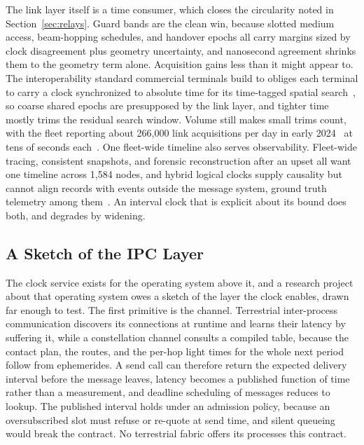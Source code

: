 \documentclass[twocolumn,10pt]{article}
\begin{document}
The link layer itself is a time consumer, which closes the circularity noted in Section~\ref{sec:relays}. Guard bands are the clean win, because slotted medium access, beam-hopping schedules, and handover epochs all carry margins sized by clock disagreement plus geometry uncertainty, and nanosecond agreement shrinks them to the geometry term alone. Acquisition gains less than it might appear to. The interoperability standard commercial terminals build to obliges each terminal to carry a clock synchronized to absolute time for its time-tagged spatial search~\cite{sdaoct}, so coarse shared epochs are presupposed by the link layer, and tighter time mostly trims the residual search window. Volume still makes small trims count, with the fleet reporting about 266{,}000 link acquisitions per day in early 2024~\cite{brashears2024} at tens of seconds each~\cite{wu2024,sdaoct}. One fleet-wide timeline also serves observability. Fleet-wide tracing, consistent snapshots, and forensic reconstruction after an upset all want one timeline across 1{,}584 nodes, and hybrid logical clocks supply causality but cannot align records with events outside the message system, ground truth telemetry among them~\cite{kulkarni2014,lamport1978}. An interval clock that is explicit about its bound does both, and degrades by widening.

\subsection{A Sketch of the IPC Layer}\label{sec:ipc}
The clock service exists for the operating system above it, and a research project about that operating system owes a sketch of the layer the clock enables, drawn far enough to test. The first primitive is the channel. Terrestrial inter-process communication discovers its connections at runtime and learns their latency by suffering it, while a constellation channel consults a compiled table, because the contact plan, the routes, and the per-hop light times for the whole next period follow from ephemerides. A send call can therefore return the expected delivery interval before the message leaves, latency becomes a published function of time rather than a measurement, and deadline scheduling of messages reduces to lookup. The published interval holds under an admission policy, because an oversubscribed slot must refuse or re-quote at send time, and silent queueing would break the contract. No terrestrial fabric offers its processes this contract.
\end{document}
